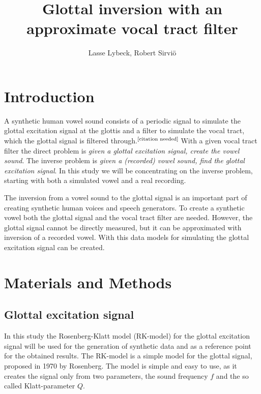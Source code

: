 \documentclass[12pt,a4]{article}
\title{Glottal inversion with an approximate vocal tract filter}
\author{Lasse Lybeck, Robert Sirviö}
\newcommand{\citeneeded}{\ensuremath{\vphantom{1}^{\text{[citation needed]}}\,}}
\begin{document}
\maketitle

\section{Introduction}\label{sec:intro}

A synthetic human vowel sound consists of a periodic signal to simulate the glottal excitation signal at the glottis and a filter to simulate the vocal tract, which the glottal signal is filtered through.\citeneeded With a given vocal tract filter the direct problem is \emph{given a glottal excitation signal, create the vowel sound}. The inverse problem is \emph{given a (recorded) vowel sound, find the glottal excitation signal}. In this study we will be concentrating on the inverse problem, starting with both a simulated vowel and a real recording.

The inversion from a vowel sound to the glottal signal is an important part of creating synthetic human voices and speech generators. To create a synthetic vowel both the glottal signal and the vocal tract filter are needed. However, the glottal signal cannot be directly measured, but it can be approximated with inversion of a recorded vowel. With this data models for simulating the glottal excitation signal can be created.


\section{Materials and Methods}\label{sec:methods}

\subsection{Glottal excitation signal}
\label{sec:rk}

In this study the Rosenberg-Klatt model (RK-model) for the glottal excitation signal will be used for the generation of synthetic data and as a reference point for the obtained results. The RK-model is a simple model for the glottal signal, proposed in 1970 by Rosenberg.\cite{rosenberg} The model is simple and easy to use, as it creates the signal only from two parameters, the sound frequency $f$ and the so called Klatt-parameter $Q$.
\end{document}
